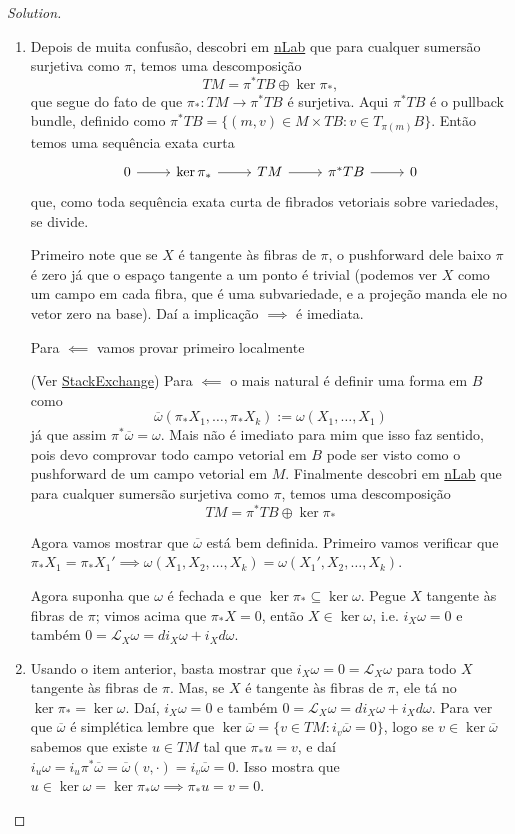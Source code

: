\begin{proof}[Solution]\leavevmode
\begin{enumerate}[label=\alph*.]
	\item Depois de muita confusão, descobri em \href{https://ncatlab.org/nlab/show/vertical+vector+field}{nLab} que para cualquer sumersão surjetiva como $\pi$, temos uma descomposição
\[TM=\pi^*TB\oplus \ker \pi_*,\]
que segue do fato de que $\pi_* :TM\longrightarrow \pi^*TB$ é surjetiva. Aqui $\pi^*TB$ é o pullback bundle, definido como $\pi^*TB=\{(m,v)\in M\times TB:v\in T_{\pi(m)}B\}$. Então temos uma sequência exata curta
\[\begin{tikzcd}
	0\arrow[r]&\ker \pi_*\arrow[r]& TM\arrow[r]&\pi^*TB\arrow[r]&0
\end{tikzcd}\]
que, como toda sequência exata curta de fibrados vetoriais sobre variedades, se divide.


		Primeiro note que se $X$ é tangente às fibras de $\pi$, o pushforward dele baixo $\pi$ é zero já que o espaço tangente a um ponto é trivial (podemos ver $X$ como um campo em cada fibra, que é uma subvariedade, e a projeção manda ele no vetor zero na base). Daí a implicação $\implies $ é imediata.

	Para $\impliedby$ vamos provar primeiro localmente

	(Ver \href{https://math.stackexchange.com/questions/69658/basic-differential-forms}{StackExchange}) Para $\impliedby$ o mais natural é definir uma forma em $B$ como
	\[\overline{\omega}(\pi_*X_1,\ldots,\pi_*X_k):=\omega(X_1,\ldots,X_1)\]
já que assim $\pi^*\overline{\omega}=\omega$. Mais não é imediato para mim que isso faz sentido, pois devo comprovar todo campo vetorial em $B$ pode ser visto como o pushforward de um campo vetorial em $M$. Finalmente descobri em \href{https://ncatlab.org/nlab/show/vertical+vector+field}{nLab} que para cualquer sumersão surjetiva como $\pi$, temos uma descomposição
\[TM=\pi^*TB\oplus \ker \pi_*\]

Agora vamos mostrar que $\overline{\omega}$ está bem definida. Primeiro vamos verificar que  {\color{4}$\pi_*X_1=\pi_*X_1'\implies \omega(X_1,X_2,\ldots,X_k)=\omega(X_1',X_2,\ldots,X_k)$.}

Agora suponha que $\omega$ é fechada e que $\ker \pi_*\subseteq \ker \omega$. Pegue $X$ tangente às fibras de $\pi$; vimos acima que $\pi_*X=0$, então $X\in\ker \omega$, i.e. $i_X\omega=0$ e também $0=\mathcal{L}_{X}\omega =di_X\omega+i_Xd\omega$.

\item Usando o item anterior, basta mostrar que $i_X\omega =0=\mathcal{L}_{X}\omega$ para todo $X$ tangente às fibras de $\pi$. Mas, se $X$ é tangente às fibras de $\pi$, ele tá no $\ker \pi_*=\ker \omega$. Daí, $i_X\omega=0$ e também $0=\mathcal{L}_{X}\omega=di_X\omega+i_Xd\omega$. Para ver que $\overline{\omega}$ é simplética lembre que $\ker \overline{\omega}=\{v\in TM: i_{v}\overline{\omega}=0\}$, logo se $v\in\ker \overline{\omega}$ sabemos que existe $u\in TM$ tal que $\pi_*u=v$, e daí $i_u\omega=i_u\pi^*\overline{\omega}=\overline{\omega}(v,\cdot )=i_v\overline{\omega}=0$. Isso mostra que $u\in\ker \omega=\ker \pi_*\omega\implies \pi_*u=v=0$.


\end{enumerate}
\end{proof}
